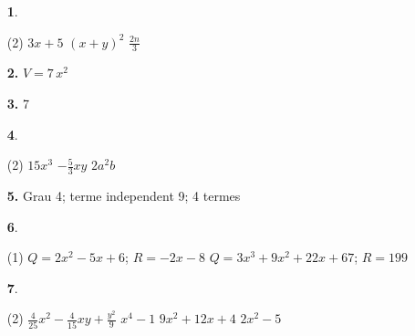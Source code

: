 \documentclass[a4paper, pdf, twoside]{book}
\begin{document}
\begin{multicols}{2}
\begin{enumerate}
 \end{enumerate}
\begin{enumerate}
\vspace{0.25cm}



 \item[\fontfamily{phv}\selectfont\color{blue}\textbf{1}. ]  \scalebox{0.6}{\simbolclau } 
 \begin{tasks}[column-sep=1em, item-indent=1.3333em](2)
	 \task $3x+5$
	 \task $(x+y)^2$
	 \task $\frac {2n}{3}$
\end{tasks}
\vspace{0.25cm}
\item[\fontfamily{phv}\selectfont\color{blue}\textbf{2. }]  \scalebox{0.6}{\simbolclau } 
$V=7\,x^2$
\vspace{0.25cm}
\item[\fontfamily{phv}\selectfont\color{blue}\textbf{3. }]  \scalebox{0.6}{\simbolclau } 
7
\vspace{0.25cm}



 \item[\fontfamily{phv}\selectfont\color{blue}\textbf{4}. ]  \scalebox{0.6}{\simbolclau } 
 \begin{tasks}[column-sep=1em, item-indent=1.3333em](2)
	 \task $15x^3$
	 \task $-\frac {5}{3}xy$
	 \task $2a^2 b$
\end{tasks}
\vspace{0.25cm}
\item[\fontfamily{phv}\selectfont\color{blue}\textbf{5. }]  \scalebox{0.6}{\simbolclau } 
Grau 4; terme independent 9; 4 termes
\vspace{0.25cm}



 \item[\fontfamily{phv}\selectfont\color{blue}\textbf{6}. ]  \scalebox{0.6}{\simbolclau } 
 \begin{tasks}[column-sep=1em, item-indent=1.3333em](1)
	 \task $Q=2x^2-5x+6$; $R=-2x-8$
	 \task $Q=3x^3+9x^2+22x+67$; $R=199$
\end{tasks}
\vspace{0.25cm}



 \item[\fontfamily{phv}\selectfont\color{blue}\textbf{7}. ]  \scalebox{0.6}{\simbolclau } 
 \begin{tasks}[column-sep=1em, item-indent=1.3333em](2)
	 \task* $\frac {4}{25}x^2 - \frac {4}{15}xy + \frac {y^2}{9}$
	 \task $x^4 - 1$
	 \task $9x^2+12x+4$
	 \task $2x^2 -5$
\end{tasks}
\vspace{0.25cm}



\end{enumerate}
\end{multicols}
\end{document}
